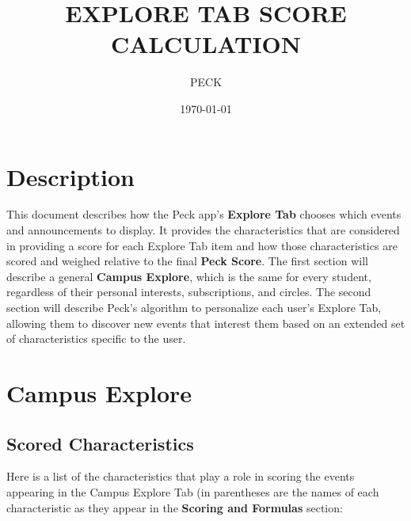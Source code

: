 \documentclass[12pt]{amsart}
\begin{document}
  

\title{EXPLORE TAB SCORE CALCULATION}

\author{PECK}

\date{\today}

\maketitle  %


\section*{Description}

This document describes how the Peck app's \textbf{Explore Tab} chooses which events and announcements to display. It provides the characteristics that are considered in providing a score for each Explore Tab item and how those characteristics are scored and weighed relative to the final \textbf{Peck Score}. The first section will describe a general \textbf{Campus Explore}, which is the same for every student, regardless of their personal interests, subscriptions, and circles. The second section will describe Peck's algorithm to personalize each user's Explore Tab, allowing them to discover new events that interest them based on an extended set of characteristics specific to the user.

\section*{Campus Explore}

\subsection*{Scored Characteristics}

Here is a list of the characteristics that play a role in scoring the events appearing in the Campus Explore Tab (in parentheses are the names of each characteristic as they appear in the \textbf{Scoring and Formulas} section: \newline
\end{document}

